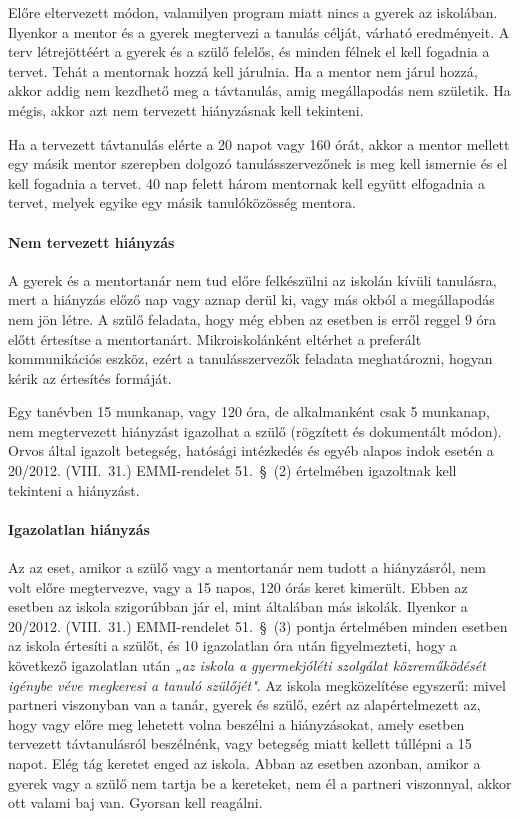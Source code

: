 Előre eltervezett módon, valamilyen program miatt nincs a gyerek az
iskolában. Ilyenkor a mentor és a gyerek megtervezi a tanulás célját,
várható eredményeit. A terv létrejöttéért a gyerek és a szülő felelős,
és minden félnek el kell fogadnia a tervet. Tehát a mentornak hozzá kell
járulnia. Ha a mentor nem járul hozzá, akkor addig nem kezdhető meg a
távtanulás, amig megállapodás nem születik. Ha mégis, akkor azt nem
tervezett hiányzásnak kell tekinteni.

Ha a tervezett távtanulás elérte a 20 napot vagy 160 órát, akkor a
mentor mellett egy másik mentor szerepben dolgozó tanulásszervezőnek is
meg kell ismernie és el kell fogadnia a tervet. 40 nap felett három
mentornak kell együtt elfogadnia a tervet, melyek egyike egy másik
tanulóközösség mentora.

\hypertarget{nem-tervezett-hianyzas}{%
\paragraph{Nem tervezett hiányzás}\label{nem-tervezett-hianyzas}}

A gyerek és a mentortanár nem tud előre felkészülni az iskolán kívüli
tanulásra, mert a hiányzás előző nap vagy aznap derül ki, vagy más okból
a megállapodás nem jön létre. A szülő feladata, hogy még ebben az
esetben is erről reggel 9 óra előtt értesítse a mentortanárt.
Mikroiskolánként eltérhet a preferált kommunikációs eszköz, ezért a
tanulásszervezők feladata meghatározni, hogyan kérik az értesítés
formáját.

Egy tanévben 15 munkanap, vagy 120 óra, de alkalmanként csak 5 munkanap,
nem megtervezett hiányzást igazolhat a szülő (rögzített és dokumentált
módon). Orvos által igazolt betegség, hatósági intézkedés és egyéb
alapos indok esetén a 20/2012. (VIII.~31.) EMMI-rendelet 51.~§~(2)
értelmében igazoltnak kell tekinteni a hiányzást.

\hypertarget{igazolatlan-hianyzas}{%
\paragraph{Igazolatlan hiányzás}\label{igazolatlan-hianyzas}}

Az az eset, amikor a szülő vagy a mentortanár nem tudott a hiányzásról,
nem volt előre megtervezve, vagy a 15 napos, 120 órás keret kimerült.
Ebben az esetben az iskola szigorúbban jár el, mint általában más
iskolák. Ilyenkor a 20/2012. (VIII.~31.) EMMI-rendelet 51.~§~(3) pontja
értelmében minden esetben az iskola értesíti a szülőt, és 10 igazolatlan
óra után figyelmezteti, hogy a következő igazolatlan után \emph{„az
iskola a gyermekjóléti szolgálat közreműködését igénybe véve megkeresi a
tanuló szülőjét"}. Az iskola megközelítése egyszerű: mivel partneri
viszonyban van a tanár, gyerek és szülő, ezért az alapértelmezett az,
hogy vagy előre meg lehetett volna beszélni a hiányzásokat, amely
esetben tervezett távtanulásról beszélnénk, vagy betegség miatt kellett
túllépni a 15 napot. Elég tág keretet enged az iskola. Abban az esetben
azonban, amikor a gyerek vagy a szülő nem tartja be a kereteket, nem él
a partneri viszonnyal, akkor ott valami baj van. Gyorsan kell reagálni.

